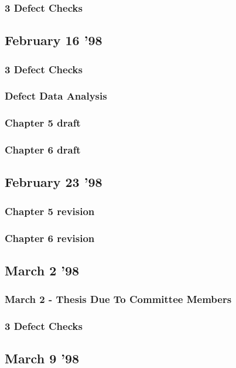 \subsubsection{3 Defect Checks}

\subsection{February 16 '98}
\subsubsection{3 Defect Checks}
\subsubsection{Defect Data Analysis}
\subsubsection{Chapter 5 draft}
\subsubsection{Chapter 6 draft}

\subsection{February 23 '98}
\subsubsection{Chapter 5 revision}
\subsubsection{Chapter 6 revision}

\subsection{March 2 '98}
\subsubsection{March 2 - Thesis Due To Committee Members}
\subsubsection{3 Defect Checks}

\subsection{March 9 '98}
